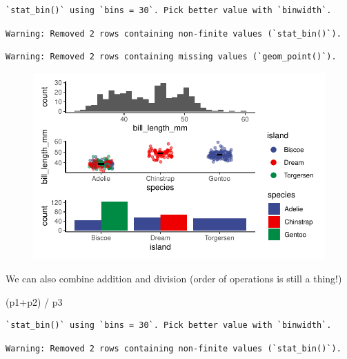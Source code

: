 \documentclass[
  letterpaper,
  DIV=11,
  numbers=noendperiod]{scrartcl}
\newenvironment{Shaded}{\begin{snugshade}}{\end{snugshade}}
\newcommand{\NormalTok}[1]{\textcolor[rgb]{0.00,0.23,0.31}{#1}}
\newcommand{\SpecialCharTok}[1]{\textcolor[rgb]{0.37,0.37,0.37}{#1}}
\begin{document}
\begin{verbatim}
`stat_bin()` using `bins = 30`. Pick better value with `binwidth`.
\end{verbatim}

\begin{verbatim}
Warning: Removed 2 rows containing non-finite values (`stat_bin()`).
\end{verbatim}

\begin{verbatim}
Warning: Removed 2 rows containing missing values (`geom_point()`).
\end{verbatim}

\begin{figure}[H]

{\centering \includegraphics{facets_files/figure-pdf/unnamed-chunk-8-1.pdf}

}

\end{figure}

We can also combine addition and division (order of operations is still
a thing!)

\begin{Shaded}
\begin{Highlighting}[]
\NormalTok{(p1}\SpecialCharTok{+}\NormalTok{p2) }\SpecialCharTok{/}\NormalTok{ p3}
\end{Highlighting}
\end{Shaded}

\begin{verbatim}
`stat_bin()` using `bins = 30`. Pick better value with `binwidth`.
\end{verbatim}

\begin{verbatim}
Warning: Removed 2 rows containing non-finite values (`stat_bin()`).
\end{verbatim}
\end{document}
